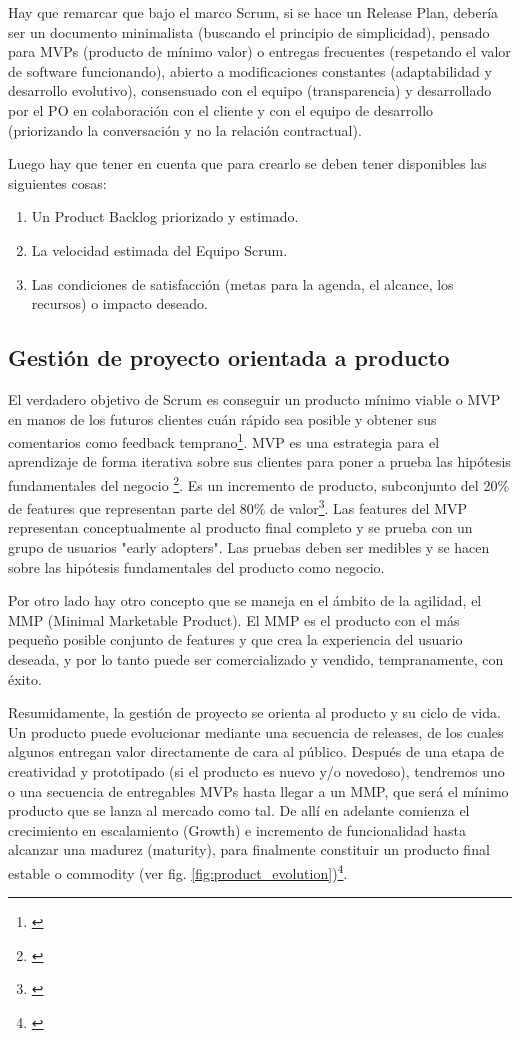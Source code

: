 Hay que remarcar que bajo el marco Scrum, si se hace un Release Plan, debería ser un documento minimalista (buscando el principio de simplicidad), pensado para MVPs (producto de mínimo valor) o entregas frecuentes (respetando el valor de software funcionando), abierto a modificaciones constantes (adaptabilidad y desarrollo evolutivo), consensuado con el equipo (transparencia) y desarrollado por el PO en colaboración con el cliente y con el equipo de desarrollo (priorizando la conversación y no la relación contractual).

Luego hay que tener en cuenta que para crearlo se deben tener disponibles las siguientes cosas:

\begin{enumerate}
\item Un Product Backlog priorizado y estimado.
\item La velocidad estimada del Equipo Scrum.
\item Las condiciones de satisfacción (metas para la agenda, el alcance, los recursos) o impacto deseado.
\end{enumerate}

\subsection{Gestión de proyecto orientada a producto}

El verdadero objetivo de Scrum es conseguir un producto mínimo viable o MVP en manos de los futuros clientes cuán rápido sea posible y obtener sus comentarios como feedback temprano\footnote{\cite{Jeff-Sutherland-2016}}. MVP es una estrategia para el aprendizaje de forma iterativa sobre sus clientes para poner a prueba las hipótesis fundamentales del negocio \footnote{\cite{Greg-Gehrich-2012}}. Es un incremento de producto, subconjunto del 20\% de features que representan parte del 80\% de valor\footnote{\cite{Jeff-Sutherland-2016}}. Las features del MVP representan conceptualmente al producto final completo y se prueba con un grupo de usuarios "early adopters". Las pruebas deben ser medibles y se hacen sobre las hipótesis fundamentales del producto como negocio.

Por otro lado hay otro concepto que se maneja en el ámbito de la agilidad, el MMP (Minimal Marketable Product). El MMP es el producto con el más pequeño posible conjunto de features y que crea la experiencia del usuario deseada, y por lo tanto puede ser comercializado y vendido, tempranamente, con éxito.

Resumidamente, la gestión de proyecto se orienta al producto y su ciclo de vida. Un producto puede evolucionar mediante una secuencia de releases, de los cuales algunos entregan valor directamente de cara al público. Después de una etapa de creatividad y prototipado (si el producto es nuevo y/o novedoso), tendremos uno o una secuencia de entregables MVPs hasta llegar a un MMP, que será el mínimo producto que se lanza al mercado como tal. De allí en adelante comienza el crecimiento en escalamiento (Growth) e incremento de funcionalidad hasta alcanzar una madurez (maturity), para finalmente constituir un producto final estable o commodity (ver fig. \ref{fig:product_evolution})\footnote{\cite{Greg-Gehrich-2012}}.

